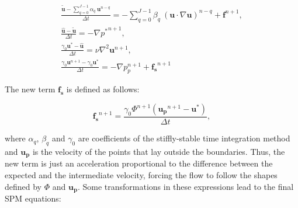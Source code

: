 \begin{subequations}
\begin{gather}
    \frac{\mathbf{\tilde{u}}-\sum_{q=0}^{J-1}\alpha_q~\mathbf{u}^{n-q}}
        {\Delta t} = -\sum_{q=0}^{J-1}\beta_q~(\mathbf{u}\cdot
        \nabla\mathbf{u})^{n-q} + \mathbf{f}^{n+1},\\
    \frac{\mathbf{\hat{u}}-\mathbf{\tilde{u}}}{\Delta t} =
        -\nabla {p^*}^{n+1},\\[3mm]
    \frac{\gamma_0\mathbf{u^*}-\mathbf{\hat{u}}}{\Delta t} =
        \nu\nabla^2\mathbf{u}^{n+1},\\[3mm]
    \frac{\gamma_0\mathbf{u}^{n+1}-\gamma_0\mathbf{u^*}}{\Delta t} =
        -\nabla p_p^{n+1} + \mathbf{f_s}^{n+1}
\end{gather}
\end{subequations}

The new term $\mathbf{f_s}$ is defined as follows:

\begin{equation}
    \mathbf{f_s}^{n+1} = \frac{\gamma_0\Phi^{n+1}(\mathbf{u_p}^{n+1}-
        \mathbf{u^*})}{\Delta t},
\end{equation}

where $\alpha_q$, $\beta_q$ and $\gamma_0$ are coefficients of the
stiffly-stable time integration method and $\mathbf{u_p}$ is the velocity of
the points that lay outside the boundaries. Thus, the new term is just an
acceleration proportional to the difference between the expected and the
intermediate velocity, forcing the flow to follow the shapes defined by $\Phi$
and $\mathbf{u_p}$. Some transformations in these expressions lead to the final
SPM equations:

